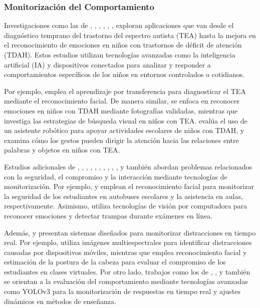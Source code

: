 \documentclass[a4paper,fleqn]{cas-sc}
\begin{document}
			\subsubsection{Monitorización del Comportamiento}
				Investigaciones como las de \cite{Akter2021}, \cite{Albrecht2014}, \cite{Berrezueta-Guzman2021}, \cite{Pelc2006}, \cite{VilliersRader2021}, \cite{Warren2015Brief}, \cite{Washington2016AWereable} exploran aplicaciones que van desde el diagnóstico temprano del trastorno del espectro autista (TEA) hasta la mejora en el reconocimiento de emociones en niños con trastornos de déficit de atención (TDAH). Estos estudios utilizan tecnologías avanzadas como la inteligencia artificial (IA) y dispositivos conectados para analizar y responder a comportamientos específicos de los niños en entornos controlados o cotidianos.
				
				Por ejemplo, \cite{Akter2021} emplea el aprendizaje por transferencia para diagnosticar el TEA mediante el reconocimiento facial. De manera similar, \cite{Pelc2006} se enfoca en reconocer emociones en niños con TDAH mediante fotografías validadas, mientras que \cite{Albrecht2014} investiga las estrategias de búsqueda visual en niños con TEA. \cite{Berrezueta-Guzman2021} evalúa el uso de un asistente robótico para apoyar actividades escolares de niños con TDAH, y \cite{VilliersRader2021} examina cómo los gestos pueden dirigir la atención hacia las relaciones entre palabras y objetos en niños con TEA.
				
				Estudios adicionales de \cite{Boumiza2017}, \cite{DaCosta2023}, \cite{Enadula2021}, \cite{Farsani2020}, \cite{Hachad2020}, \cite{James2019},  \cite{Kulkarni2023}, \cite{Kumar2024Zoom}, \cite{Muller2018ArchnSmile}, \cite{Narkhede2023}, y \cite{Ozdamli2022} también abordan problemas relacionados con la seguridad, el compromiso y la interacción mediante tecnologías de monitorización. Por ejemplo, \cite{Hachad2020} y \cite{James2019} emplean el reconocimiento facial para monitorizar la seguridad de los estudiantes en autobuses escolares y la asistencia en aulas, respectivamente. Asimismo, \cite{Ozdamli2022} utiliza tecnologías de visión por computadora para reconocer emociones y detectar trampas durante exámenes en línea.
				
				Además, \cite{Campbell2015Using} y \cite{Ucar2022Recognizing} presentan sistemas diseñados para monitorizar distracciones en tiempo real. Por ejemplo, \cite{Campbell2015Using} utiliza imágenes multiespectrales para identificar distracciones causadas por dispositivos móviles, mientras que \cite{Ucar2022Recognizing} emplea reconocimiento facial y estimación de la postura de la cabeza para evaluar el compromiso de los estudiantes en clases virtuales. Por otro lado, trabajos como los de \cite{Argel2023Intellitell}, \cite{Erazo2016Easing}, y \cite{Nguyen2019} también se orientan a la evaluación del comportamiento mediante tecnologías avanzadas como YOLOv3 para la monitorización de respuestas en tiempo real y ajustes dinámicos en métodos de enseñanza.
				
\end{document}
